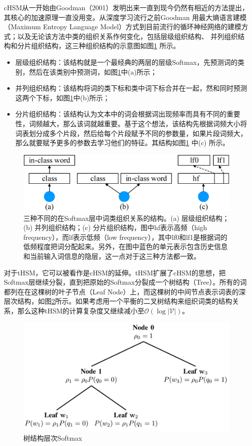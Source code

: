 \documentclass[12pt,a4paper]{article}
\begin{document}
cHSM从一开始由Goodman（2001）发明出来一直到现今仍然有相近的方法提出，其核心的加速原理一直没用变。从深度学习流行之前Goodman 用最大熵语言建模（Maximum Entropy Language Model）方式\cite{DBLP:conf/icassp/Goodman01}到目前流行的循环神经网络的建模方式\cite{DBLP:conf/asru/MikolovDPBC11}；以及无论该方法中类的组织关系作何变化，包括层级组织结构\cite{DBLP:journals/jmlr/BengioDVJ03}、 并列组织结构\cite{DBLP:conf/icassp/MikolovKBCK11}和分片组织结构\cite{DBLP:conf/acl/ChenGA16}，这三种组织结构的示意图如图\ref{fig:softmax} 所示。
\begin{itemize}
  \item 层级组织结构：该结构就是一个最经典的两层的层级Softmax，先预测词的类别，然后在该类别中预测词，如图\ref{fig:softmax}中(a)所示；
  \item 并列组织结构：该结构将词的类下标和类中词下标合并在一起，然和同时预测这两个下标，如图\ref{fig:softmax}中(b)所示；
  \item 分片组织结构：该结构认为文本中的词会根据词出现频率而具有不同的重要性，词频越大，那么该词就越重要。基于这个想法，该结构先根据词频大小将词表划分成多个片段，然后给每个片段赋予不同的参数量，如果片段词频大，那么就要赋予更多的参数去学习他们的特征。其结构如图\ref{fig:softmax} 中(c) 所示。
\end{itemize}
\begin{figure}
  \centering
  \includegraphics[width=0.65\columnwidth]{./figures/softmax3.png}
  \caption{三种不同的在Softmax层中词类组织关系的结构。(a) 层级组织结构；(b) 并列组织结构；(c) 分片组织结构，图中hf表示高频（high frequency），而lf表示低频（low frequency），其中lf0和lf1是根据词的低频程度把词分配起来。另外，在图中蓝色的单元表示包含历史信息和当前输入词信息的隐层，这一点对于这三种方法都一致。}
  \label{fig:softmax}
\end{figure}

对于tHSM，它可以被看作是cHSM的延伸。tHSM扩展了cHSM的思想，把Softmax层继续分裂，直到把原始的Softmax分裂成一个树结构（Tree）。所有的词都列在在这棵树的叶子节点（Leaf Node）上，而这棵树的中间节点表示词表的深层次结构，如图\ref{fig:thsm}所示。如果考虑用一个平衡的二叉树结构来组织词类的结构关系，那么这种tHSM的计算复杂度又继续减小至${\mathcal{O}(\log |\mathcal{V}|)}$。
\begin{figure}
  \centering
  \includegraphics[width=0.65\columnwidth]{./figures/thsm.jpg}
  \caption{树结构层次Softmax}
  \label{fig:thsm}
\end{figure}
\end{document}
